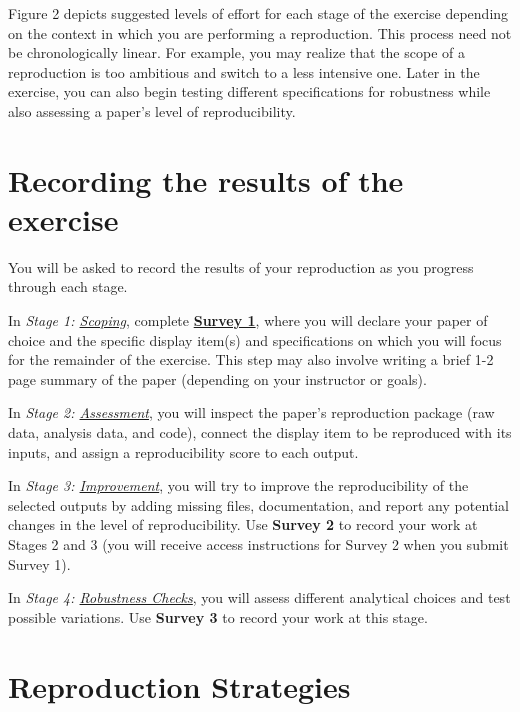 \documentclass[]{book}
\begin{document}
Figure 2 depicts suggested levels of effort for each stage of the exercise depending on the context in which you are performing a reproduction. This process need not be chronologically linear. For example, you may realize that the scope of a reproduction is too ambitious and switch to a less intensive one. Later in the exercise, you can also begin testing different specifications for robustness while also assessing a paper's level of reproducibility.

\hypertarget{recording-the-results-of-the-exercise}{%
\section*{Recording the results of the exercise}\label{recording-the-results-of-the-exercise}}

You will be asked to record the results of your reproduction as you progress through each stage.

In \emph{Stage 1: \protect\hyperlink{scoping}{Scoping}}, complete \textbf{\href{https://berkeley.qualtrics.com/jfe/form/SV_2bO83uJvU9ZiTXv}{Survey 1}}, where you will declare your paper of choice and the specific display item(s) and specifications on which you will focus for the remainder of the exercise. This step may also involve writing a brief 1-2 page summary of the paper (depending on your instructor or goals).

In \emph{Stage 2: \protect\hyperlink{assessment}{Assessment}}, you will inspect the paper's reproduction package (raw data, analysis data, and code), connect the display item to be reproduced with its inputs, and assign a reproducibility score to each output.

In \emph{Stage 3: \protect\hyperlink{improvements}{Improvement}}, you will try to improve the reproducibility of the selected outputs by adding missing files, documentation, and report any potential changes in the level of reproducibility. Use \textbf{Survey 2} to record your work at Stages 2 and 3 (you will receive access instructions for Survey 2 when you submit Survey 1).

In \emph{Stage 4: \protect\hyperlink{robust}{Robustness Checks}}, you will assess different analytical choices and test possible variations. Use \textbf{Survey 3} to record your work at this stage.

\hypertarget{reproduction-strategies}{%
\section*{Reproduction Strategies}\label{reproduction-strategies}}
\end{document}
